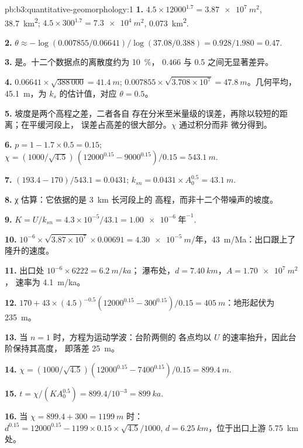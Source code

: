 \begin{solution}{pb:b3:quantitative-geomorphology:1}
\textbf{1.} $4.5\times12000^{1.7} = \qty{3.87e7}{m^2}$, \qty{38.7}{km^2};
$4.5\times300^{1.7} = \qty{7.3e4}{m^2}$, \qty{0.073}{km^2}.

\textbf{2.} $\theta \approx -\log(0.007855/0.06641)/\log(37.08/0.388) =
0.928/1.980 = 0.47$.

\textbf{3.} 是。十二个数据点的离散度约为 \qty{10}{\percent}，
$0.466$ 与 0.5 之间无显著差异。

\textbf{4.} $0.06641\times\sqrt{388\,000} = \qty{41.4}{m}$;
$0.007855\times\sqrt{3.708\times10^7} = \qty{47.8}{m}$。几何平均，
\qty{45.1}{m}，为 $k_s$ 的估计值，对应 $\theta = 0.5$。

\textbf{5.} 坡度是两个高程之差，二者各自
存在分米至米量级的误差，再除以较短的距离；在平缓河段上，
误差占高差的很大部分。$\chi$ 通过积分而非
微分得到。

\textbf{6.} $p = 1 - 1.7\times0.5 = 0.15$; $\chi = (1000/\sqrt{4.5})\,
(12000^{0.15} - 9000^{0.15})/0.15 = \qty{543.1}{m}$.

\textbf{7.} $(193.4 - 170)/543.1 = 0.0431$; $k_{sn} = 0.0431\times A_0^{0.5}
= \qty{43.1}{m}$.

\textbf{8.} χ 估算：它依据的是 \qty{3}{km} 长河段上的
高程，而非十二个带噪声的坡度。

\textbf{9.} $K = U/k_{sn} = 4.3\times10^{-5}/43.1 = \qty{1.00e-6}{\text{年}^{-1}}$.

\textbf{10.} $10^{-6}\times\sqrt{3.87\times10^7}\times0.00691 =
\qty{4.30e-5}{m/\text{年}}$，\qty{43}{m/Ma}：出口跟上了
隆升的速度。

\textbf{11.} 出口处 $10^{-6}\times6222 = \qty{6.2}{m/ka}$；
瀑布处，$d = \qty{7.40}{km}$，$A = \qty{1.70e7}{m^2}$，
速率为 \qty{4.1}{m/ka}。

\textbf{12.} $170 + 43\times(4.5)^{-0.5}(12000^{0.15} - 300^{0.15})/0.15 =
\qty{405}{m}$：地形起伏为 \qty{235}{m}。

\textbf{13.} 当 $n = 1$ 时，方程为运动学波：台阶两侧的
各点均以 $U$ 的速率抬升，因此台阶保持其高度，
即落差 \qty{25}{m}。

\textbf{14.} $\chi = (1000/\sqrt{4.5})(12000^{0.15} - 7400^{0.15})/0.15 =
\qty{899.4}{m}$.

\textbf{15.} $t = \chi/(KA_0^{0.5}) = 899.4/10^{-3} = \qty{899}{ka}$.

\textbf{16.} 当 $\chi = 899.4 + 300 = \qty{1199}{m}$ 时：
$d^{0.15} = 12000^{0.15} - 1199\times0.15\times\sqrt{4.5}/1000$, $d =
\qty{6.25}{km}$，位于出口上游 \qty{5.75}{km} 处。


\end{solution}

